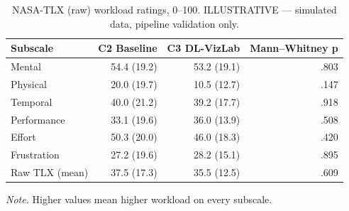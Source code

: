 \begin{table}[htbp]
\centering
\small
\caption{NASA-TLX (raw) workload ratings, 0–100. ILLUSTRATIVE — simulated data, pipeline validation only.}
\label{tab:T12}
\begin{tabular}{lrrr}
\toprule
Subscale & C2 Baseline & C3 DL-VizLab & Mann–Whitney p \\
\midrule
Mental & 54.4 (19.2) & 53.2 (19.1) & .803 \\
Physical & 20.0 (19.7) & 10.5 (12.7) & .147 \\
Temporal & 40.0 (21.2) & 39.2 (17.7) & .918 \\
Performance & 33.1 (19.6) & 36.0 (13.9) & .508 \\
Effort & 50.3 (20.0) & 46.0 (18.3) & .420 \\
Frustration & 27.2 (19.6) & 28.2 (15.1) & .895 \\
Raw TLX (mean) & 37.5 (17.3) & 35.5 (12.5) & .609 \\
\bottomrule
\end{tabular}
\par\smallskip\footnotesize\textit{Note.} Higher values mean higher workload on every subscale.
\end{table}
